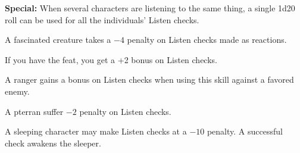 \textbf{Special:} When several characters are listening to the same thing, a single 1d20 roll can be used for all the individuals' Listen checks.

A fascinated creature takes a $-4$ penalty on Listen checks made as reactions.

If you have the  feat, you get a +2 bonus on Listen checks.

A ranger gains a bonus on Listen checks when using this skill against a favored enemy.



A pterran suffer $-2$ penalty on Listen checks.

A sleeping character may make Listen checks at a $-10$ penalty. A successful check awakens the sleeper.